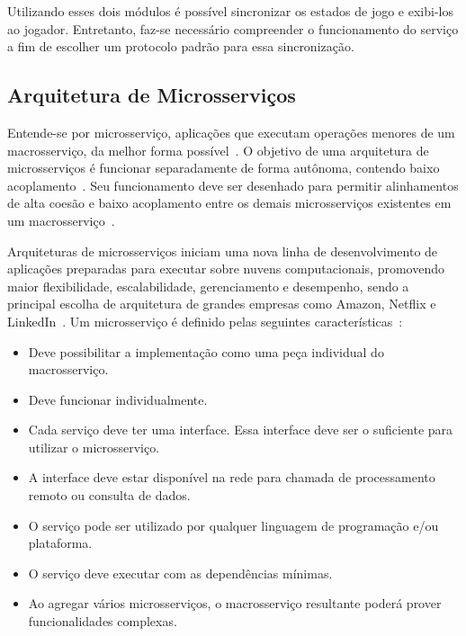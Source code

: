 Utilizando esses dois módulos é possível sincronizar os estados de jogo e exibi-los ao jogador.
%
Entretanto, faz-se necessário compreender o funcionamento do serviço a fim de escolher um protocolo padrão para essa sincronização.



\subsection{Arquitetura de Microsserviços}
\label{sec:microsservicos}



Entende-se por microsserviço, aplicações que executam operações menores de um macrosserviço, da melhor forma possível~\cite{stephenclarkewillson2017, Newman2015Feb}.
%
O objetivo de uma arquitetura de microsserviços é funcionar separadamente de forma autônoma, contendo baixo acoplamento~\cite{Newman2015Feb}.
%
Seu funcionamento deve ser desenhado para permitir alinhamentos de alta coesão e baixo acoplamento entre os demais microsserviços existentes em um macrosserviço~\cite{8169955}.



Arquiteturas de microsserviços iniciam uma nova linha de desenvolvimento de aplicações preparadas para executar sobre nuvens computacionais, promovendo maior flexibilidade, escalabilidade, gerenciamento e desempenho, sendo a principal escolha de arquitetura de grandes empresas como Amazon, Netflix e LinkedIn~\cite{7830692,7515686}.
%
Um microsserviço é definido pelas seguintes características~\cite{8169955}:



\begin{itemize}
  \item Deve possibilitar a implementação como uma peça individual do macrosserviço.
  \item Deve funcionar individualmente.
  \item Cada serviço deve ter uma interface. Essa interface deve ser o suficiente para utilizar o microsserviço.
  \item A interface deve estar disponível na rede para chamada de processamento remoto ou consulta de dados.
  \item O serviço pode ser utilizado por qualquer linguagem de programação e/ou plataforma.
  \item O serviço deve executar com as dependências mínimas.
  \item Ao agregar vários microsserviços, o macrosserviço resultante poderá prover funcionalidades complexas.
\end{itemize}



